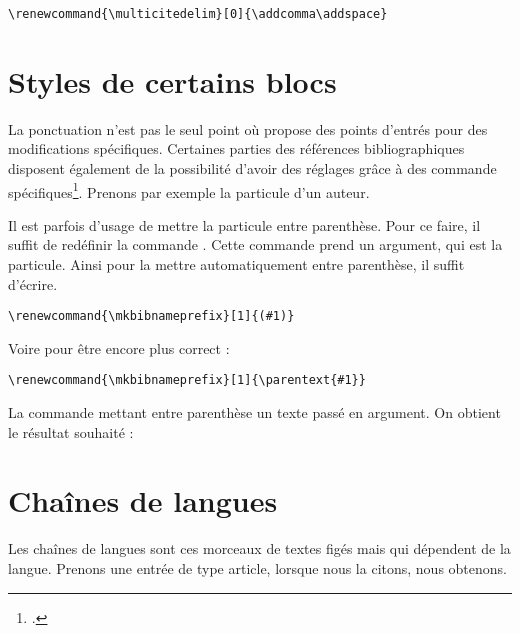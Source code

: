 \begin{verbatim}
\renewcommand{\multicitedelim}[0]{\addcomma\addspace}
\end{verbatim}

\section{Styles de certains blocs}

La ponctuation n'est pas le seul point où  propose des points d'entrés pour des modifications spécifiques. Certaines parties des références bibliographiques disposent également de la possibilité d'avoir des réglages grâce à des commande spécifiques\footcite{biblatex_hooks}. Prenons par exemple la particule d'un auteur.
	
	\begin{quotation}
	\cite{BeauvoirSexe}
	\end{quotation}
	
	\renewcommand{\mkbibnameprefix}[1]{\parentext{#1}}
	
Il est parfois d'usage de mettre la particule entre parenthèse. Pour ce faire, il suffit de redéfinir la commande . Cette commande prend un argument, qui est la particule. Ainsi pour la mettre automatiquement entre parenthèse, il suffit d'écrire.
	
	\begin{verbatim}
\renewcommand{\mkbibnameprefix}[1]{(#1)}
	\end{verbatim}
	
Voire pour être encore plus correct :
	
	\begin{verbatim}
\renewcommand{\mkbibnameprefix}[1]{\parentext{#1}}
	\end{verbatim}

La commande  mettant entre parenthèse un texte passé en argument. On obtient le résultat souhaité : 

	\begin{quotation}
	\cite{BeauvoirSexe}
	\end{quotation}

\section{Chaînes de langues}\label{i18nchaines}
	
	Les chaînes de langues sont ces morceaux de textes figés mais qui dépendent de la langue. Prenons une entrée de type article, lorsque nous la citons, nous obtenons.
	
